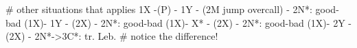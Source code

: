 # other situations that applies
 1X -(P) - 1Y - (2M jump overcall) - 2N*: good-bad
(1X)- 1Y - (2X) - 2N*: good-bad
(1X)- X* - (2X) - 2N*: good-bad
(1X)- 2Y - (2X) - 2N*->3C*: tr. Leb.  # notice the difference!

